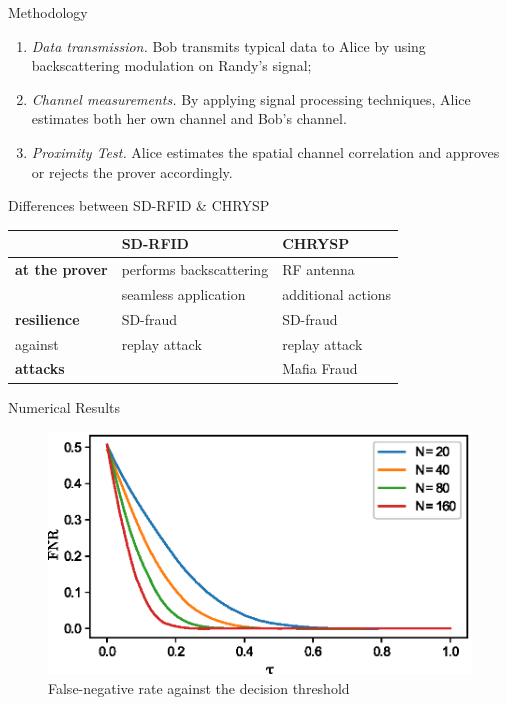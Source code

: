 \begin{frame}{Methodology}
\begin{enumerate}
    \item \textit{Data transmission.} Bob transmits typical data to Alice by using backscattering modulation on Randy's signal; 
    \item \textit{Channel measurements.} By applying signal processing techniques, Alice estimates both her own channel and Bob's channel. 
    \item \textit{Proximity Test.} Alice estimates the spatial channel correlation and approves or rejects the prover accordingly.  
\end{enumerate}
    
\end{frame}

\begin{frame}{Differences between SD-RFID \& CHRYSP}
\centering
\begin{tabular}{|p{2.5cm}|p{4cm}|p{3.5cm}|}
\hline
& \textbf{SD-RFID} & \textbf{CHRYSP} \\
\hline

\textbf{at the prover} & performs backscattering & RF antenna \\
 & seamless application & additional actions\\
\hline
\textbf{resilience} & SD-fraud & SD-fraud \\
 against& replay attack & replay attack \\
 \textbf{attacks}&               & Mafia Fraud \\
\hline

\end{tabular}
    
\end{frame}

\begin{frame}{Numerical Results}
\begin{figure}
    \centering
    \includegraphics[scale = 0.8]{figures/against_distance_fraud/FNR_protect.eps}
    
    \caption{False-negative rate against the decision threshold}
\end{figure}
\end{frame}



